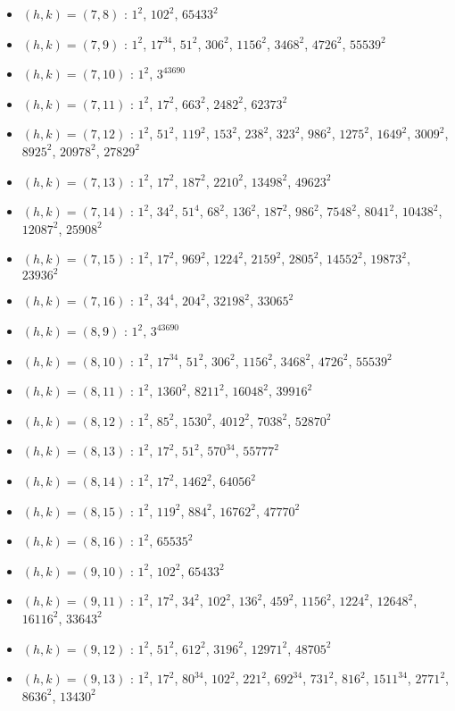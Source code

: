 \begin{itemize}
\item $(h,k)=(7,8)$ : $1^{2}$, $102^{2}$, $65433^{2}$
\item $(h,k)=(7,9)$ : $1^{2}$, $17^{34}$, $51^{2}$, $306^{2}$, $1156^{2}$, $3468^{2}$, $4726^{2}$, $55539^{2}$
\item $(h,k)=(7,10)$ : $1^{2}$, $3^{43690}$
\item $(h,k)=(7,11)$ : $1^{2}$, $17^{2}$, $663^{2}$, $2482^{2}$, $62373^{2}$
\item $(h,k)=(7,12)$ : $1^{2}$, $51^{2}$, $119^{2}$, $153^{2}$, $238^{2}$, $323^{2}$, $986^{2}$, $1275^{2}$, $1649^{2}$, $3009^{2}$, $8925^{2}$, $20978^{2}$, $27829^{2}$
\item $(h,k)=(7,13)$ : $1^{2}$, $17^{2}$, $187^{2}$, $2210^{2}$, $13498^{2}$, $49623^{2}$
\item $(h,k)=(7,14)$ : $1^{2}$, $34^{2}$, $51^{4}$, $68^{2}$, $136^{2}$, $187^{2}$, $986^{2}$, $7548^{2}$, $8041^{2}$, $10438^{2}$, $12087^{2}$, $25908^{2}$
\item $(h,k)=(7,15)$ : $1^{2}$, $17^{2}$, $969^{2}$, $1224^{2}$, $2159^{2}$, $2805^{2}$, $14552^{2}$, $19873^{2}$, $23936^{2}$
\item $(h,k)=(7,16)$ : $1^{2}$, $34^{4}$, $204^{2}$, $32198^{2}$, $33065^{2}$
\item $(h,k)=(8,9)$ : $1^{2}$, $3^{43690}$
\item $(h,k)=(8,10)$ : $1^{2}$, $17^{34}$, $51^{2}$, $306^{2}$, $1156^{2}$, $3468^{2}$, $4726^{2}$, $55539^{2}$
\item $(h,k)=(8,11)$ : $1^{2}$, $1360^{2}$, $8211^{2}$, $16048^{2}$, $39916^{2}$
\item $(h,k)=(8,12)$ : $1^{2}$, $85^{2}$, $1530^{2}$, $4012^{2}$, $7038^{2}$, $52870^{2}$
\item $(h,k)=(8,13)$ : $1^{2}$, $17^{2}$, $51^{2}$, $570^{34}$, $55777^{2}$
\item $(h,k)=(8,14)$ : $1^{2}$, $17^{2}$, $1462^{2}$, $64056^{2}$
\item $(h,k)=(8,15)$ : $1^{2}$, $119^{2}$, $884^{2}$, $16762^{2}$, $47770^{2}$
\item $(h,k)=(8,16)$ : $1^{2}$, $65535^{2}$
\item $(h,k)=(9,10)$ : $1^{2}$, $102^{2}$, $65433^{2}$
\item $(h,k)=(9,11)$ : $1^{2}$, $17^{2}$, $34^{2}$, $102^{2}$, $136^{2}$, $459^{2}$, $1156^{2}$, $1224^{2}$, $12648^{2}$, $16116^{2}$, $33643^{2}$
\item $(h,k)=(9,12)$ : $1^{2}$, $51^{2}$, $612^{2}$, $3196^{2}$, $12971^{2}$, $48705^{2}$
\item $(h,k)=(9,13)$ : $1^{2}$, $17^{2}$, $80^{34}$, $102^{2}$, $221^{2}$, $692^{34}$, $731^{2}$, $816^{2}$, $1511^{34}$, $2771^{2}$, $8636^{2}$, $13430^{2}$

\end{itemize}
